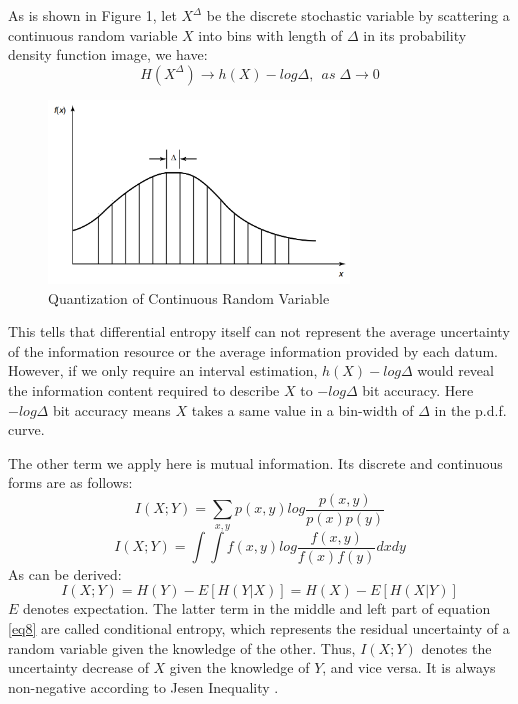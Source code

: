 \documentclass[draft,wrr]{AGUTeX}
\begin{document}
\begin{article}
As is shown in Figure 1, let $X^\Delta$ be the discrete stochastic variable by scattering a continuous random variable $X$ into bins with length of $\Delta$ in its probability density function image, we have:
\begin{equation}\label{correct}
H(X^\Delta)\to h(X)-log\Delta,~~as\; \Delta \to 0
\end{equation}
\begin{figure}[H]
\centering
\includegraphics[width=8cm]{Quantization.png}
\caption{Quantization of Continuous Random Variable}%
\end{figure}
This tells that differential entropy itself can not represent the average uncertainty of the information resource or the average information provided by each datum. However, if we only require an interval estimation, $h(X)-log\Delta $ would reveal the information content required to describe $X$ to $ -log\Delta$ bit accuracy\citep{cover2012elements}.  Here $ -log\Delta$ bit accuracy means $X$ takes a same value in a bin-width of $\Delta$ in the p.d.f. curve. 

The other term we apply here is mutual information. Its discrete and continuous forms are as follows:
\begin{equation}
I(X;Y)=\sum_{x,y}p(x,y)log\frac{p(x,y)}{p(x)p(y)}
\end{equation}
\begin{equation}
I(X;Y)=\int \int f(x,y)log\frac{f(x,y)}{f(x)f(y)}dxdy
\end{equation}
As can be derived:
\begin{equation}\label{eq8}
I(X;Y)=H(Y)-E[H(Y|X)]=H(X)-E[H(X|Y)]
\end{equation}
$E$ denotes expectation. The latter term in the middle and left part of equation \eqref{eq8} 
are called conditional entropy, which represents the residual uncertainty of a random variable given the knowledge of the other. Thus,
$I(X;Y)$ denotes %
the uncertainty decrease of $X$ given the knowledge of $Y$, and vice versa. It is always non-negative according to  Jesen Inequality \citep{cover2012elements}.


\end{article}
\end{document}
